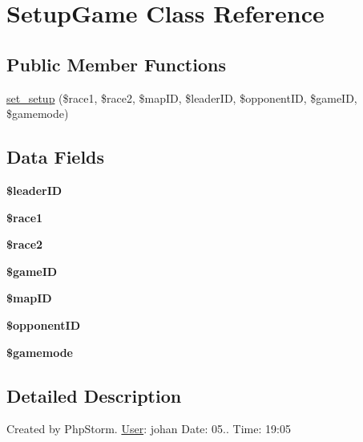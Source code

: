 \hypertarget{class_setup_game}{}\section{Setup\+Game Class Reference}
\label{class_setup_game}
\subsection*{Public Member Functions}
\begin{DoxyCompactItemize}
\item 
\hyperlink{class_setup_game_a075e4bec4b509da98abb32143f175e0e}{set\+\_\+setup} (\$race1, \$race2, \$map\+ID, \$leader\+ID, \$opponent\+ID, \$game\+ID, \$gamemode)
\end{DoxyCompactItemize}
\subsection*{Data Fields}
\begin{DoxyCompactItemize}
\item 
\mbox{\label{class_setup_game_ae011f12226aa240566aa5b17c6a905a4}} 
{\bfseries \$leader\+ID}
\item 
\mbox{\label{class_setup_game_af8613490d33c93235d9753a9839bddf9}} 
{\bfseries \$race1}
\item 
\mbox{\label{class_setup_game_a0857d41d4220fe1d00a157cd50913313}} 
{\bfseries \$race2}
\item 
\mbox{\label{class_setup_game_aa27e936ca36f62a3e0478528c5274356}} 
{\bfseries \$game\+ID}
\item 
\mbox{\label{class_setup_game_ace12b3203ac5df07d868adda1786188e}} 
{\bfseries \$map\+ID}
\item 
\mbox{\label{class_setup_game_ad0db2a880e262730fabe6a221910aefc}} 
{\bfseries \$opponent\+ID}
\item 
\mbox{\label{class_setup_game_a3fd98457ff4f3251dfac6d6a01965f98}} 
{\bfseries \$gamemode}
\end{DoxyCompactItemize}


\subsection{Detailed Description}
Created by Php\+Storm. \hyperlink{class_user}{User}\+: johan Date\+: 05.. Time\+: 19\+:05 

